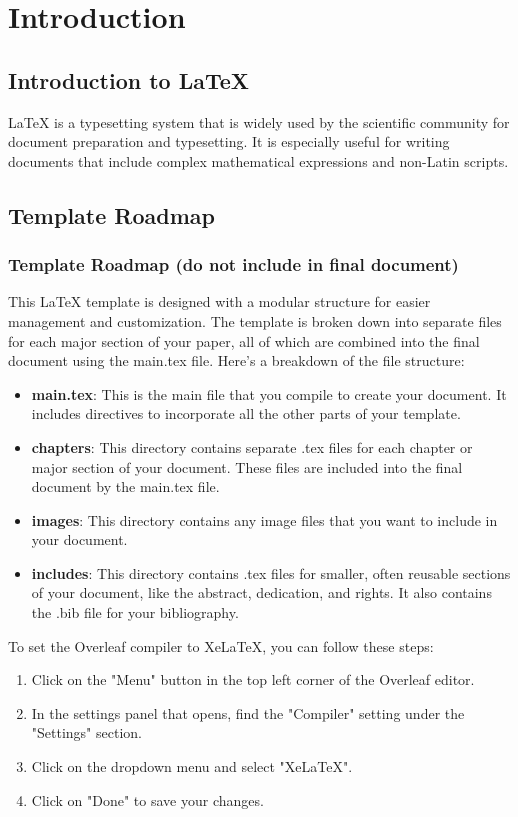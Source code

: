 \chapter{Introduction}

\section{Introduction to LaTeX}
LaTeX is a typesetting system that is widely used by the scientific community for document preparation and typesetting. It is especially useful for writing documents that include complex mathematical expressions and non-Latin scripts.


\section{Template Roadmap}

\subsection*{Template Roadmap (do not include in final document)}
This LaTeX template is designed with a modular structure for easier management and customization. The template is broken down into separate files for each major section of your paper, all of which are combined into the final document using the main.tex file. Here's a breakdown of the file structure:

\begin{itemize}
    \item \textbf{main.tex}: This is the main file that you compile to create your document. It includes directives to incorporate all the other parts of your template.
    \item \textbf{chapters}: This directory contains separate .tex files for each chapter or major section of your document. These files are included into the final document by the main.tex file.
    \item \textbf{images}: This directory contains any image files that you want to include in your document.
    \item \textbf{includes}: This directory contains .tex files for smaller, often reusable sections of your document, like the abstract, dedication, and rights. It also contains the .bib file for your bibliography.
\end{itemize}

To set the Overleaf compiler to XeLaTeX, you can follow these steps:
\begin{enumerate}
    \item Click on the "Menu" button in the top left corner of the Overleaf editor.
    \item In the settings panel that opens, find the "Compiler" setting under the "Settings" section.
    \item Click on the dropdown menu and select "XeLaTeX".
    \item Click on "Done" to save your changes.
\end{enumerate}

